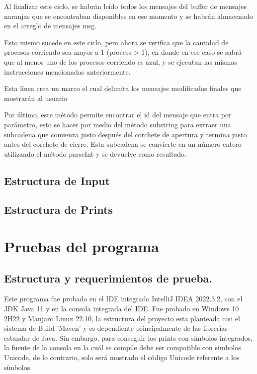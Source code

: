 \documentclass[a4paper]{article}
\begin{document}
        Al finalizar este ciclo, se habrán leído todos los mensajes del buffer de mensajes naranjas que se encontraban disponibles en ese momento y se habrán almacenado en el arreglo de mensajes msg. 

        Esto mismo sucede en este ciclo, pero ahora se verifica que la cantidad de procesos corriendo sea mayor a 1 (process > 1), en donde en ese caso se sabrá que al menos uno de los procesos corriendo es azul, y se ejecutan las mismas instrucciones mencionadas anteriormente. 

        Esta línea crea un marco el cual delimita los mensajes modificados finales que mostrarán al usuario 

        Por último, este método permite encontrar el id del mensaje que entra por parámetro, esto se hacer por medio del método substring para extraer una subcadena que comienza justo después del corchete de apertura y termina justo antes del corchete de cierre. Esta subcadena se convierte en un número entero utilizando el método parseInt y se devuelve como resultado. 

    \subsection{Estructura de Input}
    
    \subsection{Estructura de Prints}
    

\section{Pruebas del programa}

\subsection{Estructura y requerimientos de prueba.}
Este programa fue probado en el IDE integrado IntelliJ IDEA 2022.3.2, con
el JDK Java 11 y en la consola integrada del IDE. Fue probado en Windows 10 
2H22 y Manjaro Linux 22.10, la estructura del proyecto esta planteada con el
sistema de Build 'Maven' y es dependiente principalmente de las librerías estandar
de Java. Sin embargo, para conseguir los prints con símbolos integrados, la fuente
de la consola en la cuál se compile debe ser compatible con simbolos Unicode,
de lo contrario, solo será mostrado el código Unicode referente a los símbolos.
\end{document}
